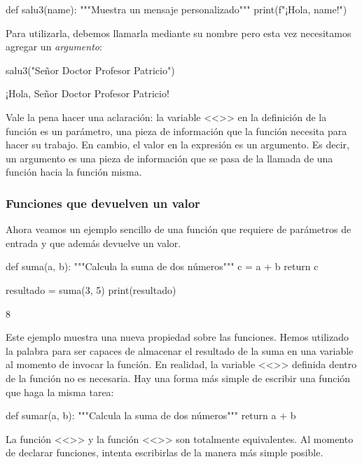 \begin{pyin}
def salu3(name):
    """Muestra un mensaje personalizado"""
    print(f"¡Hola, {name}!")
\end{pyin}

Para utilizarla, debemos llamarla mediante su nombre pero esta vez necesitamos agregar un \emph{argumento}:

\begin{pyin}
salu3("Señor Doctor Profesor Patricio")
\end{pyin}
\begin{pyout}
¡Hola, Señor Doctor Profesor Patricio!
\end{pyout}

Vale la pena hacer una aclaración: la variable <<>> en la definición de la función  es un parámetro, una pieza de información que la función necesita para hacer su trabajo. En cambio, el valor  en la expresión  es un argumento. Es decir, un argumento es una pieza de información que se pasa de la llamada de una función hacia la función misma.

\subsubsection{Funciones que devuelven un valor}
Ahora veamos un ejemplo sencillo de una función que requiere de parámetros de entrada y que además devuelve un valor. 

\begin{pyin}
def suma(a, b):
    """Calcula la suma de dos números"""
    c = a + b
    return c 

resultado = suma(3, 5)
print(resultado)
\end{pyin}
\begin{pyprint}
8
\end{pyprint}
Este ejemplo muestra una nueva propiedad sobre las funciones. Hemos utilizado la palabra  para ser capaces de almacenar el resultado de la suma en una variable al momento de invocar la función. En realidad, la variable <<>> definida dentro de la función no es necesaria. Hay una forma más simple de escribir una función que haga la misma tarea:

\begin{pyin}
def sumar(a, b):
    """Calcula la suma de dos números"""
    return a + b
\end{pyin}

La función <<>> y la función <<>> son totalmente equivalentes. Al momento de declarar funciones, intenta escribirlas de la manera más simple posible.

